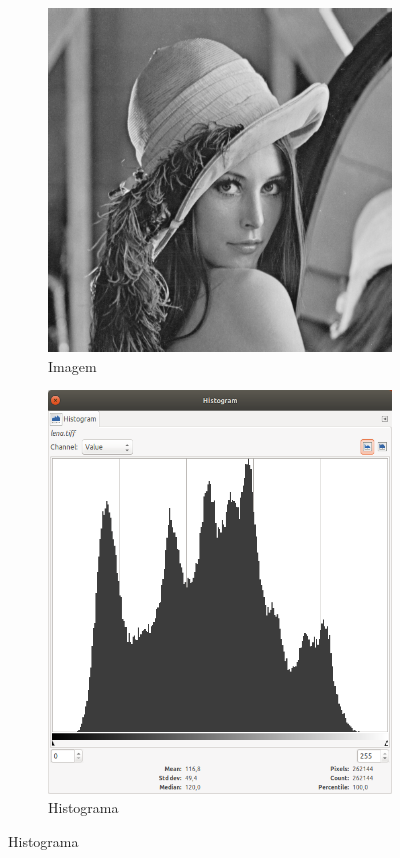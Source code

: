 \begin{figure}[!h]
    \centering
        \begin{subfigure}{\figw}
            \centering
            \includegraphics[scale=\scalei]{images/03/lena_gray.png}
            \caption{\label{fig:lena_gray:hist} Imagem}
        \end{subfigure}
        \begin{subfigure}{\figw}
            \centering
            \includegraphics[scale=\scaleh]{images/03/hist_lena_gray.png}
            \caption{\label{fig:lena_gray:hist} Histograma}
        \end{subfigure}


\end{figure}
